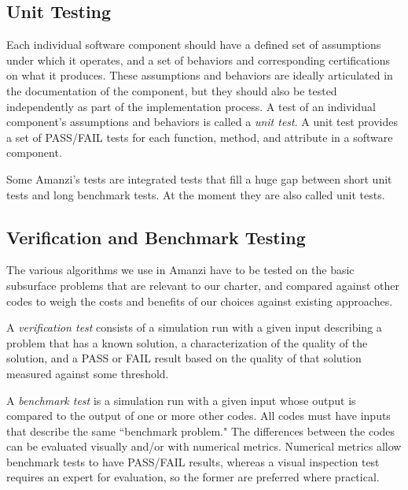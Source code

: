 

\subsection{Unit Testing}
Each individual software component should have a defined set of assumptions under 
which it operates, and a set of behaviors and corresponding certifications on 
what it produces. These assumptions and behaviors are ideally articulated in the 
documentation of the component, but they should also be tested independently as part
of the implementation process. A test of an individual component's assumptions and 
behaviors is called a {\em unit test}. A unit test provides a set of PASS/FAIL tests for 
each function, method, and attribute in a software component.

Some Amanzi's tests are integrated tests that fill a huge gap between short unit tests
and long benchmark tests.
At the moment they are also called unit tests. 



\subsection{Verification and Benchmark Testing}
The various algorithms we use in Amanzi have to be tested on the basic subsurface 
problems that are relevant to our charter, and compared against other codes to 
weigh the costs and benefits of our choices against existing approaches. 

A {\em verification test} consists of a simulation run with a given input describing 
a problem that has a known solution, a characterization of the quality of the 
solution, and a PASS or FAIL result based on the quality of that solution measured 
against some threshold. 


A {\em benchmark test} is a simulation run with a given input whose output is 
compared to the output of one or more other codes. All codes must have inputs that 
describe the same ``benchmark problem." The differences between the codes can be 
evaluated visually and/or with numerical metrics. Numerical metrics allow benchmark 
tests to have PASS/FAIL results, whereas a visual inspection test requires an 
expert for evaluation, so the former are preferred where practical.



